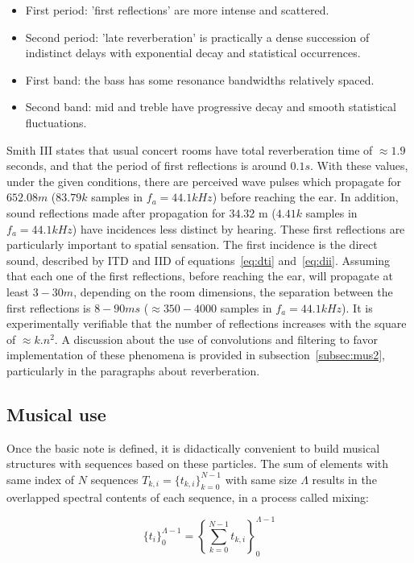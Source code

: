 \begin{itemize}
   \item First period: 'first reflections' are more intense and scattered.
   \item Second period: 'late reverberation' is practically a dense succession of indistinct delays with exponential decay and statistical occurrences.
   \item First band: the bass has some resonance bandwidths relatively spaced.
   \item Second band: mid and treble have progressive decay and smooth statistical fluctuations.
\end{itemize}

Smith III states that usual concert rooms have total reverberation time of $\approx 1.9$ seconds, and that the period of first reflections is around $0.1s$. With these values, under the given conditions, there are perceived wave pulses which propagate for $652.08m$ ($83.79k$ samples in $f_a=44.1kHz$) before reaching the ear. In addition, sound reflections made after propagation for $34.32$ m ($4.41k$ samples in $f_a=44.1kHz$) have incidences less distinct by hearing. These first reflections are particularly important to spatial sensation. The first incidence is the direct sound, described by ITD and IID of equations~\ref{eq:dti} and~\ref{eq:dii}. Assuming that each one of the first reflections, before reaching the ear, will propagate at least $3-30m$, depending on the room dimensions, the separation between the first reflections is $8-90ms$ ($\approx 350-4000$ samples in $f_a=44.1kHz$). It is experimentally verifiable that the number of reflections increases with the square of $\approx k.n^2$. A discussion about the use of convolutions and filtering to favor implementation of these phenomena is provided in subsection~\ref{subsec:mus2}, particularly in the paragraphs about reverberation.

\subsection{Musical use}\label{subsec:basMus}
Once the basic note is defined, it is didactically convenient to build musical structures with sequences based on these particles. The sum of elements with same index of $N$ sequences $T_{k,i}=\{t_{k,i}\}_{k=0}^{N-1}$ with same size $\Lambda$ results in the overlapped spectral contents of each sequence, in a process called mixing:

\begin{equation}\label{eq:mixagem}
\{t_i\}_0^{\Lambda-1}=\left \{ \sum_{k=0}^{N-1}t_{k,i} \right \}_0^{\Lambda-1}
\end{equation}

